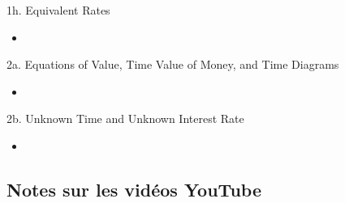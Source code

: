 \begin{CHPT_SUMM_AUTO}[label = {L.-1h}]{1h. Equivalent Rates}
	\begin{itemize}[leftmargin = *]
		\item	
	\end{itemize}
\end{CHPT_SUMM_AUTO}

\begin{CHPT_SUMM_AUTO}[label = {L.-2a}]{{2a. Equations of Value, Time Value of Money, and Time Diagrams}}
	\begin{itemize}[leftmargin = *]
		\item	
	\end{itemize}
\end{CHPT_SUMM_AUTO}

\begin{CHPT_SUMM_AUTO}[label = {L.-2b}]{2b. Unknown Time and Unknown Interest Rate}
	\begin{itemize}[leftmargin = *]
		\item	
	\end{itemize}
\end{CHPT_SUMM_AUTO}

\subsection{Notes sur les vidéos YouTube}

